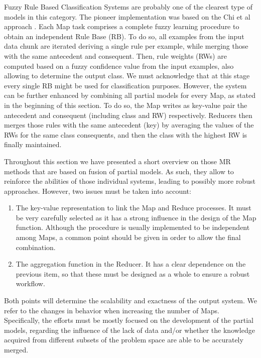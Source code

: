 \documentclass[3p,review]{elsarticle}
\begin{document}
Fuzzy Rule Based Classification Systems \cite{Fer16_fuzzyBD} are probably one of the clearest type of models in this category. The pioneer implementation was based on the Chi et al approach \cite{RioLBH15-Fuzzy}. Each Map task comprises a complete fuzzy learning procedure to obtain an independent Rule Base (RB). To do so, all examples from the input data chunk are iterated deriving a single rule per example, while merging those with the same antecedent and consequent. Then, rule weights (RWs) are computed based on a fuzzy confidence value from the input examples, also allowing to determine the output class. We must acknowledge that at this stage every single RB might be used for classification purposes. However, the system can be further enhanced by combining all partial models for every Map, as stated in the beginning of this section. To do so, the Map writes as key-value pair the antecedent and consequent (including class and RW) respectively. Reducers then merges those rules with the same antecedent (key) by averaging the values of the RWs for the same class consequents, and then the class with the highest RW is finally maintained. 


Throughout this section we have presented a short overview on those MR methods that are based on fusion of partial models. As such, they allow to reinforce the abilities of those individual systems, leading to possibly more robust approaches. However, two issues must be taken into account:

\begin{enumerate}
\item The key-value representation to link the Map and Reduce processes. It must be very carefully selected as it has a strong influence in the design of the Map function. Although the procedure is usually implemented to be independent among Maps, a common point should be given in order to allow the final combination. 

\item The aggregation function in the Reducer. It has a clear dependence on the previous item, so that these must be designed as a whole to ensure a robust workflow.

\end{enumerate}

Both points will determine the scalability and exactness of the output system. We refer to the changes in behavior when increasing the number of Maps. Specifically, the efforts must be mostly focused on the development of the partial models, regarding the influence of the lack of data and/or whether the knowledge acquired from different subsets of the problem space are able to be accurately merged.
\end{document}
